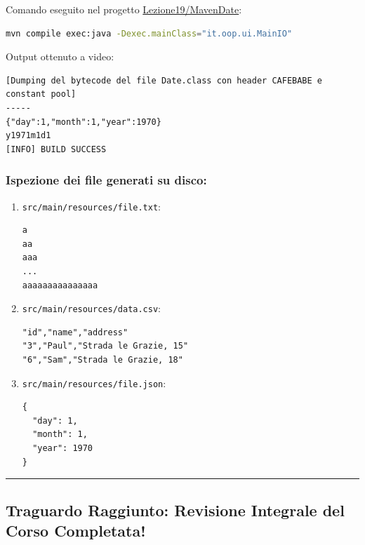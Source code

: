 \documentclass[11pt,a4paper]{article}
\newcommand{\passthrough}[1]{#1}
\begin{document}
Comando eseguito nel progetto
\href{file:///home/wally/Documenti/GitHub/Programmazione-II/25-26/Teoria-e-Esercitazioni/Codice-20260902/Lezione19/MavenDate}{Lezione19/MavenDate}:

\begin{lstlisting}[language=bash]
mvn compile exec:java -Dexec.mainClass="it.oop.ui.MainIO"
\end{lstlisting}

Output ottenuto a video:

\begin{lstlisting}
[Dumping del bytecode del file Date.class con header CAFEBABE e constant pool]
-----
{"day":1,"month":1,"year":1970}
y1971m1d1
[INFO] BUILD SUCCESS
\end{lstlisting}

\subsubsection{Ispezione dei file generati su
disco:}\label{ispezione-dei-file-generati-su-disco}

\begin{enumerate}
\def\labelenumi{\arabic{enumi}.}
\item
  \passthrough{\lstinline!src/main/resources/file.txt!}:

\begin{lstlisting}
a
aa
aaa
...
aaaaaaaaaaaaaaa
\end{lstlisting}
\item
  \passthrough{\lstinline!src/main/resources/data.csv!}:

\begin{lstlisting}
"id","name","address"
"3","Paul","Strada le Grazie, 15"
"6","Sam","Strada le Grazie, 18"
\end{lstlisting}
\item
  \passthrough{\lstinline!src/main/resources/file.json!}:

\begin{lstlisting}
{
  "day": 1,
  "month": 1,
  "year": 1970
}
\end{lstlisting}
\end{enumerate}

\begin{center}\rule{0.5\linewidth}{0.5pt}\end{center}

\subsection{Traguardo Raggiunto: Revisione Integrale del Corso
Completata!}\label{traguardo-raggiunto-revisione-integrale-del-corso-completata}
\end{document}
